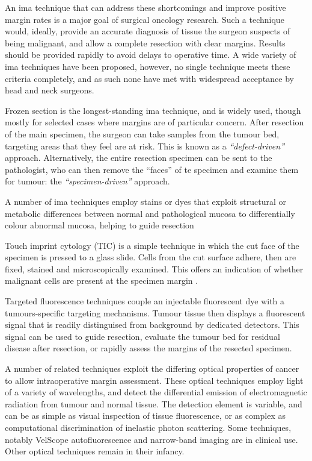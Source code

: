 An \gls{ima} technique that can address these shortcomings and improve positive margin rates is a major goal of surgical oncology research.
Such a technique would, ideally, provide an accurate diagnosis of tissue the surgeon suspects of being malignant, and allow a complete resection with clear margins.
Results should be provided rapidly to avoid delays to operative time.
A wide variety of \gls{ima} techniques have been proposed, however, no single technique meets these criteria completely, and as such none have met with widespread acceptance by head and neck surgeons.

Frozen section is the longest-standing \gls{ima} technique, and is widely used, though mostly for selected cases where margins are of particular concern.
After resection of the main specimen, the surgeon can take samples from the tumour bed, targeting  areas that they feel are at risk.
This is known as a \emph{``defect-driven''} approach.
Alternatively, the entire resection specimen can be sent to the pathologist, who can then remove the ``faces'' of te specimen and examine them for tumour: the \emph{``specimen-driven''} approach.

A number of \gls{ima} techniques employ stains or dyes that exploit structural or metabolic differences between normal and pathological mucosa to differentially colour abnormal mucosa, helping to guide resection\cite{mccaulj.a.LIHNCSLugolIodine2013, allegraEarlyGlotticCancer2020}

Touch imprint cytology (TIC) is a simple technique in which the cut face of the specimen is pressed to a glass slide. 
Cells from the cut surface adhere, then are fixed, stained and microscopically examined. 
This offers an indication of whether malignant cells are present at the specimen margin \cite{naveedDiagnosticAccuracyTouch2017}.

Targeted fluorescence techniques couple an injectable fluorescent dye with a tumours-specific targeting mechanisms.
Tumour tissue then displays a fluorescent signal that is readily distinguised from background by dedicated detectors.
This signal can be used to guide resection, evaluate the tumour bed for residual disease after resection, or rapidly assess the margins of the resected specimen.

A number of related techniques exploit the differing optical properties of cancer to allow intraoperative margin assessment.
These optical techniques employ light of a variety of wavelengths, and detect the differential emission of electromagnetic radiation from tumour and normal tissue. 
The detection element is variable, and can be as simple as visual inspection of tissue fluorescence, or as complex as computational discrimination of inelastic photon scattering.
Some techniques, notably VelScope autofluorescence and narrow-band imaging are in clinical use.
Other optical techniques remain in their infancy.

